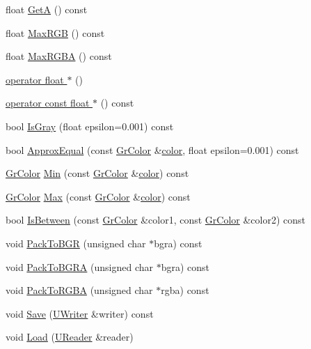 \begin{CompactItemize}
\item 
float \hyperlink{class_gr_color_1d4f646b78299bb6af131fcc14fd1982}{GetA} () const 
\item 
float \hyperlink{class_gr_color_433f7b7fb1d4b548968b337797d1043b}{MaxRGB} () const 
\item 
float \hyperlink{class_gr_color_ecd825693d1a321c285e6fc68b918b2b}{MaxRGBA} () const 
\item 
\hyperlink{class_gr_color_01b3d412305d1df103e394ce70f91163}{operator float $\ast$} ()
\item 
\hyperlink{class_gr_color_92fd3a452f76e0243a775daf3b237b48}{operator const float $\ast$} () const 
\item 
bool \hyperlink{class_gr_color_a024a38e4863cade448b994b06c2ea2d}{IsGray} (float epsilon=0.001) const 
\item 
bool \hyperlink{class_gr_color_d210feeba40d05c520147b15745041f5}{ApproxEqual} (const \hyperlink{class_gr_color}{GrColor} \&\hyperlink{glext_8h_3ea846f998d64f079b86052b6c4193a8}{color}, float epsilon=0.001) const 
\item 
\hyperlink{class_gr_color}{GrColor} \hyperlink{class_gr_color_8fbcd991fa1427da6be51d5d7070861f}{Min} (const \hyperlink{class_gr_color}{GrColor} \&\hyperlink{glext_8h_3ea846f998d64f079b86052b6c4193a8}{color}) const 
\item 
\hyperlink{class_gr_color}{GrColor} \hyperlink{class_gr_color_b9460ce4ebfe9d2c5a83c48221a7bf4c}{Max} (const \hyperlink{class_gr_color}{GrColor} \&\hyperlink{glext_8h_3ea846f998d64f079b86052b6c4193a8}{color}) const 
\item 
bool \hyperlink{class_gr_color_9f8a562ac885147466319ebae124fbe3}{IsBetween} (const \hyperlink{class_gr_color}{GrColor} \&color1, const \hyperlink{class_gr_color}{GrColor} \&color2) const 
\item 
void \hyperlink{class_gr_color_838f112474fc99372ee1aac864b8ec66}{PackToBGR} (unsigned char $\ast$bgra) const 
\item 
void \hyperlink{class_gr_color_6ed58d5f43c9ad35717e84578bd8f51a}{PackToBGRA} (unsigned char $\ast$bgra) const 
\item 
void \hyperlink{class_gr_color_2ecf5448eba8df51f4138d693b88af82}{PackToRGBA} (unsigned char $\ast$rgba) const 
\item 
void \hyperlink{class_gr_color_c55903eb54845df927fbcf8f20ae6da0}{Save} (\hyperlink{class_u_writer}{UWriter} \&writer) const 
\item 
void \hyperlink{class_gr_color_266f03bb3ae07245da1d3c033d4c2c84}{Load} (\hyperlink{class_u_reader}{UReader} \&reader)
\end{CompactItemize}


